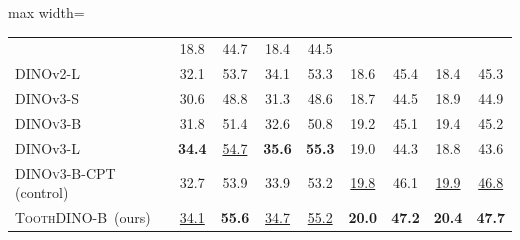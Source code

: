 \documentclass[conference]{IEEEtran}
\newcommand{\ToothDINO}{\textsc{ToothDINO}}
\newcommand{\DINOB}{\textsc{DINOv3-B}}
\newcommand{\DCT}{\textsc{DINOv3-B-CPT}}
\newcommand{\DCTControl}{\DCT{} (control)}
\newcommand{\best}[1]{\textbf{#1}}
\newcommand{\second}[1]{\underline{#1}}
\newcommand{\bk}[2]{#1~\cite{#2}}
\newcommand{\ourmethod}{\ToothDINO{}-B~}
\begin{document}
\begin{table}[t]
\begin{adjustbox}{max width=\columnwidth}
\begin{tabular}{lcccccccc}
    & 18.8 & 44.7 & 18.4 & 44.5 \\
    \bk{DINOv2-L}{oquab2023dinov2}
    & 32.1 & 53.7 & 34.1 & 53.3
    & 18.6 & 45.4 & 18.4 & 45.3 \\
    \bk{DINOv3-S}{simeoni2025dinov3}
    & 30.6 & 48.8 & 31.3 & 48.6
    & 18.7 & 44.5 & 18.9 & 44.9 \\
    \bk{\DINOB{}}{simeoni2025dinov3}
    & 31.8 & 51.4 & 32.6 & 50.8
    & 19.2 & 45.1 & 19.4 & 45.2 \\
    \bk{DINOv3-L}{simeoni2025dinov3}
    & \best{34.4} & \second{54.7} & \best{35.6} & \best{55.3}
    & 19.0 & 44.3 & 18.8 & 43.6 \\
    \DCTControl
    & 32.7 & 53.9 & 33.9 & 53.2
    & \second{19.8} & 46.1 & \second{19.9} & \second{46.8} \\
    \addlinespace[2pt]
    \ourmethod (ours)
    & \second{34.1} & \best{55.6} & \second{34.7} & \second{55.2}
    & \best{20.0} & \best{47.2} & \best{20.4} & \best{47.7} \\
    \bottomrule
  \end{tabular}
  \end{adjustbox}
\end{table}
\end{document}
